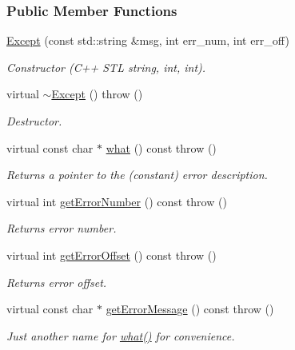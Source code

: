\subsubsection*{Public Member Functions}
\begin{DoxyCompactItemize}
\item 
\hyperlink{classjpcre2_1_1Except_a302b67f0fbc5f906bac67a4572ff29ec_a302b67f0fbc5f906bac67a4572ff29ec}{Except} (const std\+::string \&msg, int err\+\_\+num, int err\+\_\+off)
\begin{DoxyCompactList}\small\item\em Constructor (C++ S\+TL string, int, int). \end{DoxyCompactList}\item 
virtual \hyperlink{classjpcre2_1_1Except_a569a8058f61bb4e0b7085f18c4bd528c_a569a8058f61bb4e0b7085f18c4bd528c}{$\sim$\+Except} ()  throw ()
\begin{DoxyCompactList}\small\item\em Destructor. \end{DoxyCompactList}\item 
virtual const char $\ast$ \hyperlink{classjpcre2_1_1Except_aa16bdec8432ee950955f7ad81a9655bb_aa16bdec8432ee950955f7ad81a9655bb}{what} () const  throw ()
\begin{DoxyCompactList}\small\item\em Returns a pointer to the (constant) error description. \end{DoxyCompactList}\item 
virtual int \hyperlink{classjpcre2_1_1Except_a0f3e00116ab24b89836a2c2a66262e22_a0f3e00116ab24b89836a2c2a66262e22}{get\+Error\+Number} () const  throw ()
\begin{DoxyCompactList}\small\item\em Returns error number. \end{DoxyCompactList}\item 
virtual int \hyperlink{classjpcre2_1_1Except_ade3963035e250d3cbf84ddaad2056fee_ade3963035e250d3cbf84ddaad2056fee}{get\+Error\+Offset} () const  throw ()
\begin{DoxyCompactList}\small\item\em Returns error offset. \end{DoxyCompactList}\item 
virtual const char $\ast$ \hyperlink{classjpcre2_1_1Except_a6781e0804575f11d6d8bb87ec2d036c6_a6781e0804575f11d6d8bb87ec2d036c6}{get\+Error\+Message} () const  throw ()
\begin{DoxyCompactList}\small\item\em Just another name for \hyperlink{classjpcre2_1_1Except_aa16bdec8432ee950955f7ad81a9655bb_aa16bdec8432ee950955f7ad81a9655bb}{what()} for convenience. \end{DoxyCompactList}\end{DoxyCompactItemize}

